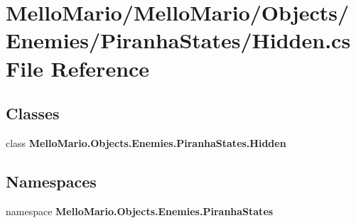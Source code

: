 \section{Mello\+Mario/\+Mello\+Mario/\+Objects/\+Enemies/\+Piranha\+States/\+Hidden.cs File Reference}
\label{Enemies_2PiranhaStates_2Hidden_8cs}
\subsection*{Classes}
\begin{DoxyCompactItemize}
\item 
class \textbf{ Mello\+Mario.\+Objects.\+Enemies.\+Piranha\+States.\+Hidden}
\end{DoxyCompactItemize}
\subsection*{Namespaces}
\begin{DoxyCompactItemize}
\item 
namespace \textbf{ Mello\+Mario.\+Objects.\+Enemies.\+Piranha\+States}
\end{DoxyCompactItemize}
